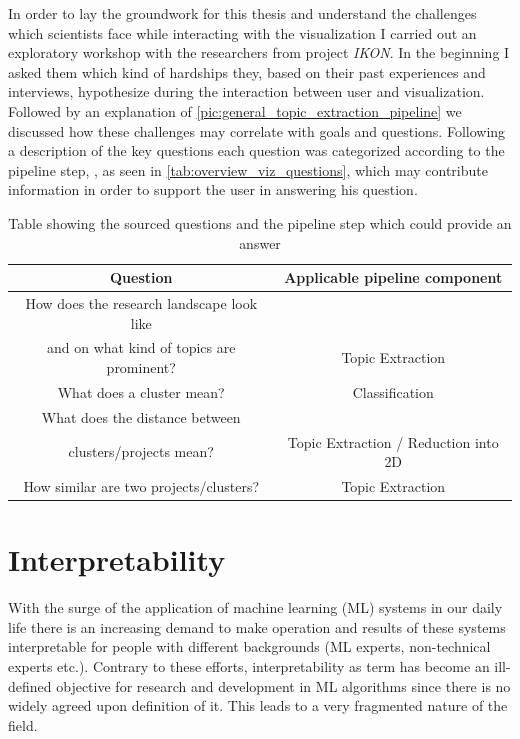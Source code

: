 In order to lay the groundwork for this thesis and understand the challenges which scientists face while interacting with the visualization I carried out an exploratory workshop with the researchers from project \textit{IKON}. In the beginning I asked them which kind of hardships they, based on their past experiences and interviews, hypothesize during the interaction between user and visualization. Followed by an explanation of \autoref{pic:general_topic_extraction_pipeline} we discussed how these challenges may correlate with goals and questions. Following a description of the key questions each question was categorized according to the pipeline step, , as seen in \autoref{tab:overview_viz_questions}, which may contribute information in order to support the user in answering his question.

\begin{table}
	\centering
	\begin{tabular}{ c | c }
		\hline 
		Question & Applicable pipeline component \\ \hline
		How does the research landscape look like \\ and on what kind of topics are prominent? & Topic Extraction \\ \hline
		What does a cluster mean? & Classification \\ \hline
		What does the distance between \\ clusters/projects mean? & Topic Extraction / Reduction into 2D \\ \hline
		How similar are two projects/clusters? & Topic Extraction \\
		\hline
	\end{tabular}
	\caption{\label{tab:overview_viz_questions} Table showing the sourced questions and the pipeline step which could provide an answer}
\end{table} 

\section{Interpretability}

With the surge of the application of machine learning (ML) systems in our daily life there is an increasing demand to make operation and results of these systems interpretable for people with different backgrounds (ML experts, non-technical experts etc.). Contrary to these efforts, interpretability as term has become an ill-defined objective \cite{liptonMythosModelInterpretability2016a} for research and development in ML algorithms since there is no widely agreed upon definition of it. This leads to a very fragmented nature of the field. 

